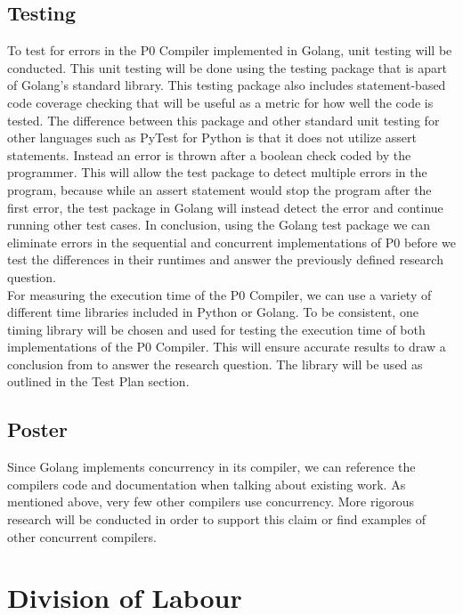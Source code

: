 \documentclass{article}
\begin{document}
\subsection{Testing}

To test for errors in the P0 Compiler implemented in Golang, unit testing will be conducted. This unit testing will be done using the  testing package that is apart of Golang's standard library. This testing package also includes statement-based code coverage checking that will be useful as a metric for how well the code is tested.
The difference between this package and other standard unit testing for other languages such as PyTest for Python is that it does not utilize assert statements.
Instead an error is thrown after a boolean check coded by the programmer. This will allow the test package to detect multiple errors in the program, because
while an assert statement would stop the program after the first error, the test package in Golang will instead detect the error and continue running other test cases.
In conclusion, using the Golang test package we can eliminate errors in the sequential and concurrent implementations of P0 before we test the differences in their runtimes
and answer the previously defined research question. \\    

For measuring the execution time of the P0 Compiler, we can use a variety of different time libraries included in Python or Golang. To be consistent, one timing library 
will be chosen
and used for testing the execution time of both implementations of the P0 Compiler. This will ensure 
accurate results to draw a conclusion from to answer the research question. The library will be used as outlined in the Test Plan section.

\subsection{Poster}

Since Golang implements concurrency in its compiler, we can reference the
compilers code and documentation when talking about existing work.
As mentioned above, very few other compilers use concurrency.
More rigorous research will be conducted in order to support this claim or
find examples of other concurrent compilers.

\section{Division of Labour} %
\end{document}

